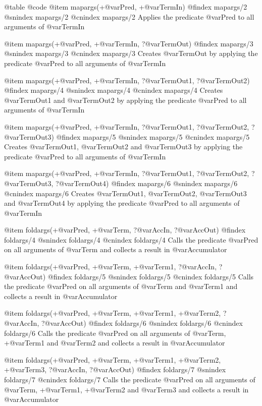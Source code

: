 @table @code
@item mapargs(+@var{Pred}, +@var{TermIn})
@findex mapargs/2
@snindex mapargs/2
@cnindex mapargs/2
      Applies the predicate @var{Pred} to all
      arguments of @var{TermIn}

@item mapargs(+@var{Pred}, +@var{TermIn}, ?@var{TermOut})
@findex mapargs/3
@snindex mapargs/3
@cnindex mapargs/3
      Creates @var{TermOut} by applying the predicate @var{Pred} to all
      arguments of @var{TermIn}

@item mapargs(+@var{Pred}, +@var{TermIn}, ?@var{TermOut1}, ?@var{TermOut2})
@findex mapargs/4
@snindex mapargs/4
@cnindex mapargs/4
      Creates  @var{TermOut1}  and @var{TermOut2} by applying the predicate @var{Pred} to all
      arguments of @var{TermIn}

@item mapargs(+@var{Pred}, +@var{TermIn}, ?@var{TermOut1}, ?@var{TermOut2}, ?@var{TermOut3})
@findex mapargs/5
@snindex mapargs/5
@cnindex mapargs/5
      Creates  @var{TermOut1}, @var{TermOut2} and  @var{TermOut3} by applying the predicate @var{Pred} to all
      arguments of @var{TermIn}

@item mapargs(+@var{Pred}, +@var{TermIn}, ?@var{TermOut1}, ?@var{TermOut2}, ?@var{TermOut3}, ?@var{TermOut4})
@findex mapargs/6
@snindex mapargs/6
@cnindex mapargs/6
      Creates  @var{TermOut1}, @var{TermOut2}, @var{TermOut3} and  @var{TermOut4} by applying the predicate @var{Pred} to all
      arguments of @var{TermIn}


@item foldargs(+@var{Pred}, +@var{Term}, ?@var{AccIn}, ?@var{AccOut})
@findex foldargs/4
@snindex foldargs/4
@cnindex foldargs/4
  Calls the predicate @var{Pred} on all arguments of @var{Term} and
collects a  result in @var{Accumulator}
         
@item foldargs(+@var{Pred}, +@var{Term}, +@var{Term1}, ?@var{AccIn}, ?@var{AccOut})
@findex foldargs/5
@snindex foldargs/5
@cnindex foldargs/5
  Calls the predicate @var{Pred} on all arguments of @var{Term} and @var{Term1} and
collects a  result in @var{Accumulator}

@item foldargs(+@var{Pred}, +@var{Term}, +@var{Term1}, +@var{Term2}, ?@var{AccIn}, ?@var{AccOut})
@findex foldargs/6
@snindex foldargs/6
@cnindex foldargs/6
  Calls the predicate @var{Pred} on all arguments of @var{Term}, +@var{Term1} and @var{Term2} and
collects a  result in @var{Accumulator}

@item foldargs(+@var{Pred}, +@var{Term}, +@var{Term1}, +@var{Term2}, +@var{Term3}, ?@var{AccIn}, ?@var{AccOut})
@findex foldargs/7
@snindex foldargs/7
@cnindex foldargs/7
  Calls the predicate @var{Pred} on all arguments of @var{Term}, +@var{Term1}, +@var{Term2} and @var{Term3} and
collects a  result in @var{Accumulator}

